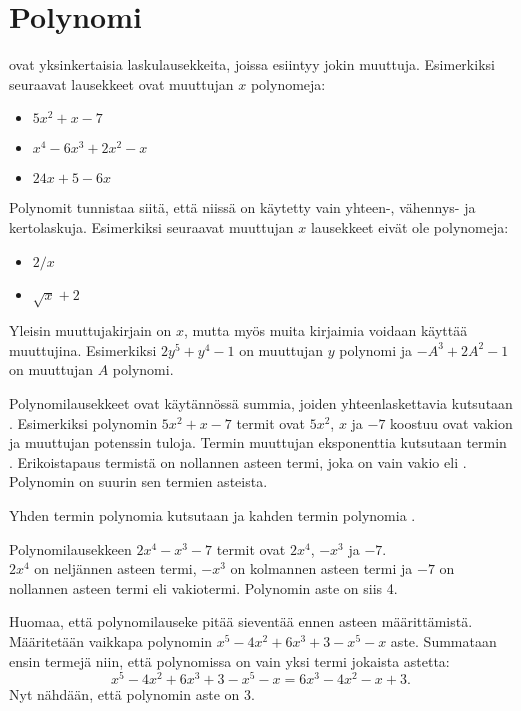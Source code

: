 \chapter{Polynomi}

 ovat yksinkertaisia laskulausekkeita, joissa esiintyy jokin muuttuja.
Esimerkiksi seuraavat lausekkeet ovat muuttujan $x$ polynomeja:
\begin{itemize}
\item $5x^2+x-7$
\item $x^4-6x^3+2x^2-x$
\item $24x+5-6x$
\end{itemize}
Polynomit tunnistaa siitä, että niissä on käytetty vain yhteen-, vähennys- ja kertolaskuja.
Esimerkiksi seuraavat muuttujan $x$ lausekkeet eivät ole polynomeja:
\begin{itemize}
\item $2/x$
\item $\sqrt{x}+2$
\end{itemize}
Yleisin muuttujakirjain on $x$, mutta myös muita kirjaimia voidaan käyttää
muuttujina. Esimerkiksi $2y^5+y^4-1$ on muuttujan $y$ polynomi ja
$-A^3+2A^2-1$ on muuttujan $A$ polynomi.

Polynomilausekkeet ovat käytännössä summia, joiden yhteenlaskettavia kutsutaan .
Esimerkiksi polynomin $5x^2+x-7$ termit ovat $5x^2$, $x$ ja $-7$ koostuu 
  ovat vakion ja muuttujan potenssin tuloja.
Termin muuttujan
eksponenttia kutsutaan termin . Erikoistapaus termistä on
nollannen asteen termi, joka on vain vakio eli . Polynomin
 on suurin sen termien asteista.

Yhden termin polynomia kutsutaan  ja kahden termin polynomia
.

\begin{esimerkki}
Polynomilausekkeen $2x^4-x^3-7$ termit ovat $2x^4$, $-x^3$ ja $-7$. \\
$2x^4$ on neljännen asteen termi, $-x^3$ on kolmannen asteen termi ja $-7$ on nollannen
asteen termi eli vakiotermi. Polynomin aste on siis 4.
\end{esimerkki}

Huomaa, että polynomilauseke pitää sieventää ennen asteen määrittämistä.
Määritetään vaikkapa polynomin $x^5-4x^2+6x^3+3-x^5-x$ aste.
Summataan ensin termejä niin, että
polynomissa on vain yksi termi jokaista astetta:
\[x^5-4x^2+6x^3+3-x^5-x = 6x^3-4x^2-x+3.\]
Nyt nähdään, että polynomin aste on 3.

